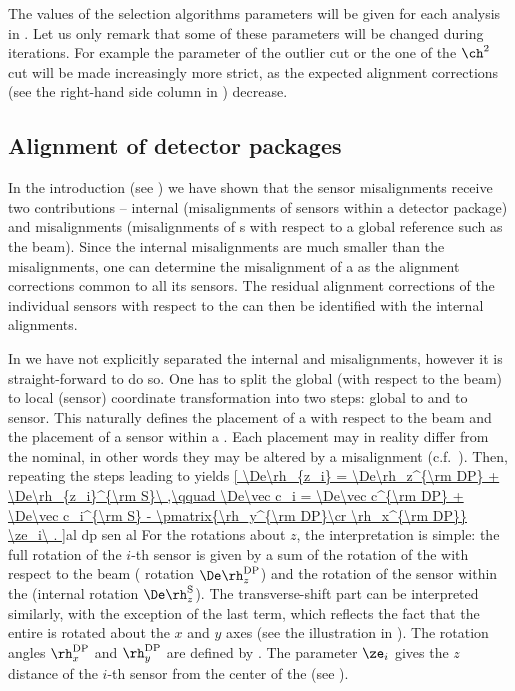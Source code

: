 The values of the selection algorithms parameters will be given for each analysis in . Let us only remark that some of these parameters will be changed during iterations. For example the parameter of the outlier cut  or the one of the $\ch^2$ cut will be made increasingly more strict, as the expected alignment corrections (see the right-hand side column in ) decrease.


\subsection[al dp fac]{Alignment of detector packages}

In the introduction (see ) we have shown that the sensor misalignments receive two contributions -- internal (misalignments of sensors within a detector package) and  misalignments (misalignments of s with respect to a global reference such as the beam). Since the internal misalignments are much smaller than the  misalignments, one can determine the misalignment of a  as the alignment corrections common to all its sensors. The residual alignment corrections of the individual sensors with respect to the  can then be identified with the internal alignments.

In  we have not explicitly separated the internal and  misalignments, however it is straight-forward to do so. One has to split the global (with respect to the beam) to local (sensor) coordinate transformation  into two steps: global to  and  to sensor. This naturally defines the placement of a  with respect to the beam and the placement of a sensor within a . Each placement may in reality differ from the nominal, in other words they may be altered by a misalignment (c.f.~). Then, repeating the steps leading to  yields
\eqref{
	\De\rh_{z_i} = \De\rh_z^{\rm DP} + \De\rh_{z_i}^{\rm S}\ ,\qquad
	\De\vec c_i = \De\vec c^{\rm DP} + \De\vec c_i^{\rm S} - \pmatrix{\rh_y^{\rm DP}\cr \rh_x^{\rm DP}} \ze_i\ .
}{al dp sen al}
For the rotations about $z$, the interpretation is simple: the full rotation of the $i$-th sensor is given by a sum of the rotation of the  with respect to the beam ( rotation $\De\rh_z^{\rm DP}$) and the rotation of the sensor within the  (internal rotation $\De\rh_z^{\rm S}$). The transverse-shift part can be interpreted similarly, with the exception of the last term, which reflects the fact that the entire  is rotated about the $x$ and $y$ axes (see the illustration in ). The rotation angles $\rh_x^{\rm DP}$ and $\rh_y^{\rm DP}$ are defined by . The parameter $\ze_i$ gives the $z$ distance of the $i$-th sensor from the center of the  (see ).

